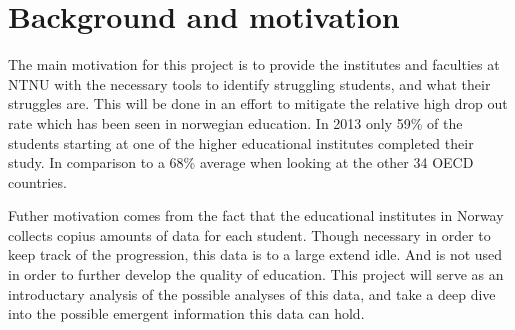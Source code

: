 \section{Background and motivation}
	The main motivation for this project is to provide the institutes and faculties at NTNU 
	with the necessary tools to identify struggling students, and what their struggles are.
	This will be done in an effort to mitigate the relative high drop out rate which has been
	seen in norwegian education. 
	In 2013 only 59\% of the students starting at one of the higher educational institutes completed their study.
	In comparison to a 68\% average when looking at the other 34 OECD countries.\cite{OECD2013}
	
	Futher motivation comes from the fact that the educational institutes in Norway collects
	copius amounts of data for each student. Though necessary in order to keep track of the progression, 
	this data is to a large extend idle. And is not used in order to further develop the quality of education. 
	This project will serve as an introductary analysis of the possible analyses of this data, 
	and take a deep dive into the possible emergent information this data can hold. 
	